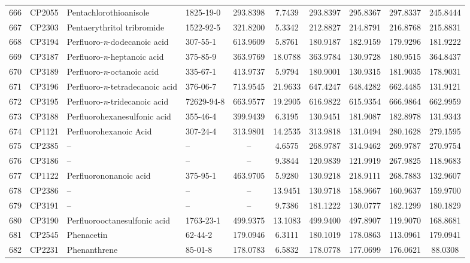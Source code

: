 \begin{longtable}{clllcccccc}
666 & CP2055 & Pentachlorothioanisole & 1825-19-0 & 293.8398 & 7.7439 & 293.8397 & 295.8367 & 297.8337 & 245.8444 \\ 
667 & CP2303 & Pentaerythritol tribromide & 1522-92-5 & 321.8200 & 5.3342 & 212.8827 & 214.8791 & 216.8768 & 215.8831 \\ 
668 & CP3194 & Perfluoro-\textit{n}-dodecanoic acid & 307-55-1 & 613.9609 & 5.8761 & 180.9187 & 182.9159 & 179.9296 & 181.9222 \\ 
669 & CP3187 & Perfluoro-\textit{n}-heptanoic acid & 375-85-9 & 363.9769 & 18.0788 & 363.9784 & 130.9728 & 180.9515 & 364.8437 \\ 
670 & CP3189 & Perfluoro-\textit{n}-octanoic acid & 335-67-1 & 413.9737 & 5.9794 & 180.9001 & 130.9315 & 181.9035 & 178.9031 \\ 
671 & CP3196 & Perfluoro-\textit{n}-tetradecanoic acid & 376-06-7 & 713.9545 & 21.9633 & 647.4247 & 648.4282 & 662.4485 & 131.9121 \\ 
672 & CP3195 & Perfluoro-\textit{n}-tridecanoic acid & 72629-94-8 & 663.9577 & 19.2905 & 616.9822 & 615.9354 & 666.9864 & 662.9959 \\ 
673 & CP3188 & Perfluorohexanesulfonic acid & 355-46-4 & 399.9439 & 6.3195 & 130.9451 & 181.9087 & 182.8978 & 131.9343 \\ 
674 & CP1121 & Perfluorohexanoic Acid & 307-24-4 & 313.9801 & 14.2535 & 313.9818 & 131.0494 & 280.1628 & 279.1595 \\ 
675 & CP2385 & – & – & – & 4.6575 & 268.9787 & 314.9462 & 269.9787 & 270.9754 \\ 
676 & CP3186 & – & – & – & 9.3844 & 120.9839 & 121.9919 & 267.9825 & 118.9683 \\ 
677 & CP1122 & Perfluorononanoic acid & 375-95-1 & 463.9705 & 5.9280 & 130.9218 & 218.9111 & 268.7883 & 132.9607 \\ 
678 & CP2386 & – & – & – & 13.9451 & 130.9718 & 158.9667 & 160.9637 & 159.9700 \\ 
679 & CP3191 & – & – & – & 9.7386 & 181.1222 & 130.0777 & 182.1299 & 180.1829 \\ 
680 & CP3190 & Perfluorooctanesulfonic acid & 1763-23-1 & 499.9375 & 13.1083 & 499.9400 & 497.8907 & 119.9070 & 168.8681 \\ 
681 & CP2545 & Phenacetin & 62-44-2 & 179.0946 & 6.3111 & 180.1019 & 178.0863 & 113.0961 & 179.0941 \\ 
682 & CP2231 & Phenanthrene & 85-01-8 & 178.0783 & 6.5832 & 178.0778 & 177.0699 & 176.0621 & 88.0308 \\ 

\end{longtable}
